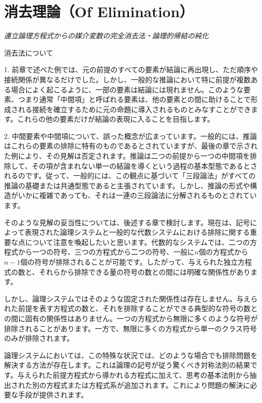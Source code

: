 \documentclass[a4paper,11pt,openany]{ltjsbook}
\begin{document}
\chapter{消去理論（Of Elimination）}
\label{ch:vii}

\begin{center}
\large\textit{連立論理方程式からの媒介変数の完全消去法・論理的帰結の純化}
\end{center}
\vspace{4mm}

消去法について

1. 前章で述べた例では、元の前提のすべての要素が結論に再出現し、ただ順序や接続関係が異なるだけでした。しかし、一般的な推論において特に前提が複数ある場合によく起こるように、一部の要素は結論には現れません。このような要素、つまり通常「中間項」と呼ばれる要素は、他の要素との間に助けることで形成される接続を確立するために元の命題に導入されるものとみなすことができます。これらの他の要素だけが結論の表現に入ることを目指します。

2. 中間要素や中間項について、誤った概念が広まっています。一般的には、推論はこれらの要素の排除に特有のものであるとされていますが、最後の章で示された例により、その見解は否定されます。推論は二つの前提から一つの中間項を排除して、その項が含まれない単一の結論を導くという過程の基本型態であるとされるのです。従って、一般的には、この観点に基づいて「三段論法」がすべての推論の基礎または共通型態であると主張されています。しかし、推論の形式や構造がいかに複雑であっても、それは一連の三段論法に分解されるものとされています。

そのような見解の妥当性については、後述する章で検討します。現在は、記号によって表現された論理システムと一般的な代数システムにおける排除に関する重要な点について注意を喚起したいと思います。代数的なシステムでは、二つの方程式から一つの符号、三つの方程式から二つの符号、一般に$n$個の方程式から$n-1$個の符号が排除されることが可能です。したがって、与えられた独立方程式の数と、それらから排除できる量の符号の数との間には明確な関係性があります。

しかし、論理システムではそのような固定された関係性は存在しません。与えられた前提を表す方程式の数と、それを排除することができる典型的な符号の数との間に固有の関係性はありません。一つの方程式から無限に多くのような符号が排除されることがあります。一方で、無限に多くの方程式から単一のクラス符号のみが排除されます。

論理システムにおいては、この特殊な状況では、どのような場合でも排除問題を解決する方法が存在します。これは論理の記号が従う驚くべき対称法則の結果です。与えられた前提方程式から導かれる方程式に加えて、思考の基本法則から抽出された別の方程式または方程式系が追加されます。これにより問題の解決に必要な手段が提供されます。
\end{document}
